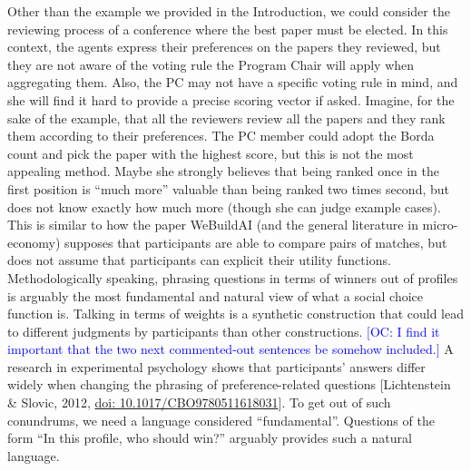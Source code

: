 \documentclass{article}
\newcommand{\commentOC}[1]{\textcolor{blue}{\small$\big[$OC: #1$\big]$}}
\begin{document}
Other than the example we provided in the Introduction, we could consider the reviewing process of a conference where the best paper must be elected. In this context, the agents express their preferences on the papers they reviewed, but they are not aware of the voting rule the Program Chair will apply when aggregating them. %
Also, the PC may not have a specific voting rule in mind, and she will find it hard to provide a precise scoring vector if asked. Imagine, for the sake of the example, that all the reviewers review all the papers and they rank them according to their preferences. The PC member could adopt the Borda count and pick the paper with the highest score, but this is not the most appealing method. Maybe she strongly believes that being ranked once in the first position is “much more” valuable than being ranked two times second, but does not know exactly how much more (though she can judge example cases). This is similar to how the paper WeBuildAI (and the general literature in micro-economy) supposes that participants are able to compare pairs of matches, but does not assume that participants can explicit their utility functions. Methodologically speaking, phrasing questions in terms of winners out of profiles is arguably the most fundamental and natural view of what a social choice function is. Talking in terms of weights is a synthetic construction that could lead to different judgments by participants than other constructions. \commentOC{I find it important that the two next commented-out sentences be somehow included.}
A research in experimental psychology shows that participants’ answers differ widely when changing the phrasing of preference-related questions [Lichtenstein \& Slovic, 2012, \href{https://doi.org/10.1017/CBO9780511618031}{doi: 10.1017/CBO9780511618031}].
To get out of such conundrums, we need a language considered “fundamental”. Questions of the form “In this profile, who should win?” arguably provides such a natural language.
\end{document}
